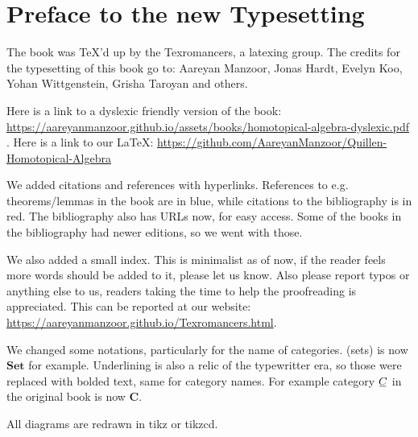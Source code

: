 \documentclass[../main]{subfiles}
\begin{document}
\chapter*{Preface to the new Typesetting}

The book was TeX'd up by the Texromancers, a latexing group. The credits for the typesetting of this book go to:  Aareyan Manzoor, Jonas Hardt, Evelyn Koo, Yohan Wittgenstein, Grisha Taroyan and others.

Here is a link to a dyslexic friendly version of the book:
\url{https://aareyanmanzoor.github.io/assets/books/homotopical-algebra-dyslexic.pdf} . Here is a link to our \LaTeX : \url{https://github.com/AareyanManzoor/Quillen-Homotopical-Algebra}

We added citations and references with hyperlinks. References to e.g. theorems/lemmas in the book are in blue, while citations to the bibliography is
in red. The bibliography also has URLs now, for easy access. Some of the books
in the bibliography had newer editions, so we went with those.

We also added a small index. This is minimalist as of now, if the reader feels more words should be added to it, please let us know. Also please report typos or anything else to us, readers taking the time to help the proofreading is appreciated. This can be reported at our website: \url{https://aareyanmanzoor.github.io/Texromancers.html}.

We changed some notations, particularly for the name of categories. (sets) is now $\mathbf{Set}$ for example. Underlining is also a relic of the typewritter era, so those were replaced with bolded text, same for category names. For example category $\xunderline{C}$ in the original book is now $\mathbf{C}$.

All diagrams are redrawn in tikz or tikzcd.
\end{document}
